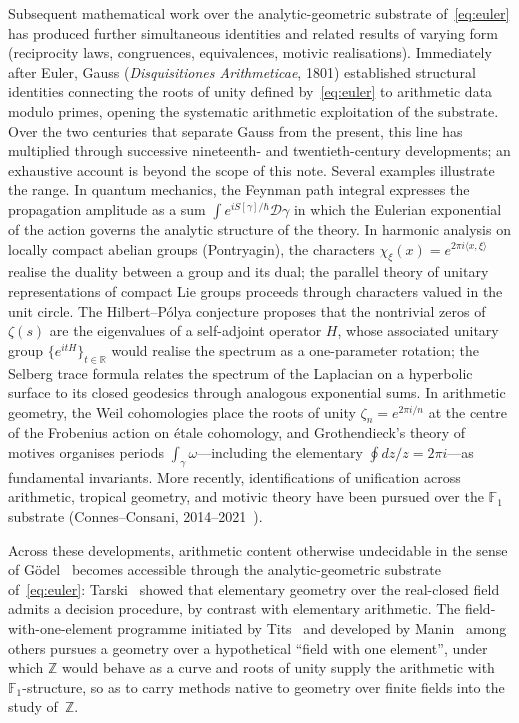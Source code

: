 \documentclass[11pt]{amsart}
\theoremstyle{definition}
\begin{document}
Subsequent mathematical work over the analytic-geometric substrate
of~\eqref{eq:euler} has produced further simultaneous identities and
related results of varying form (reciprocity laws, congruences,
equivalences, motivic realisations).  Immediately after Euler, Gauss (\emph{Disquisitiones
Arithmeticae}, 1801) established structural identities connecting the
roots of unity defined by~\eqref{eq:euler} to arithmetic data modulo
primes, opening the systematic arithmetic exploitation of the
substrate.  Over the two centuries that separate Gauss from the
present, this line has multiplied through successive
nineteenth- and twentieth-century developments; an exhaustive
account is beyond the scope of this note.  Several examples
illustrate the range.  In quantum mechanics, the Feynman path
integral expresses the propagation amplitude as a sum
$\int e^{iS[\gamma]/\hbar}\mathcal{D}\gamma$ in which the Eulerian
exponential of the action governs the analytic structure of the
theory.  In harmonic analysis on locally compact abelian groups
(Pontryagin), the characters
$\chi_\xi(x)=e^{2\pi i\langle x,\xi\rangle}$ realise the duality
between a group and its dual; the parallel theory of unitary
representations of compact Lie groups proceeds through characters
valued in the unit circle.  The Hilbert--Pólya conjecture proposes
that the nontrivial zeros of $\zeta(s)$ are the eigenvalues of a
self-adjoint operator $H$, whose associated unitary group
$\{e^{itH}\}_{t\in\mathbb{R}}$ would realise the spectrum as a
one-parameter rotation; the Selberg trace formula relates the
spectrum of the Laplacian on a hyperbolic surface to its closed
geodesics through analogous exponential sums.  In arithmetic
geometry, the Weil cohomologies place the roots of unity
$\zeta_n=e^{2\pi i/n}$ at the centre of the Frobenius action on
étale cohomology, and Grothendieck's theory of motives organises
periods $\int_\gamma\omega$---including the elementary
$\oint dz/z=2\pi i$---as fundamental invariants.  More recently,
identifications of unification across arithmetic, tropical
geometry, and motivic theory have been pursued over the
$\mathbb{F}_{1}$ substrate
(Connes--Consani, 2014--2021~\cite{connes-consani-site}).

Across these developments, arithmetic content otherwise undecidable in
the sense of Gödel~\cite{godel-1931} becomes accessible through the
analytic-geometric substrate of~\eqref{eq:euler}:
Tarski~\cite{tarski-1948} showed that elementary geometry over the
real-closed field admits a decision procedure, by contrast with
elementary arithmetic.  The field-with-one-element programme initiated
by Tits~\cite{tits-1957} and developed by Manin~\cite{manin-1995} among
others pursues a geometry over a hypothetical ``field with one
element'', under which $\mathbb{Z}$ would behave as a curve and roots of
unity supply the arithmetic with $\mathbb{F}_{1}$-structure, so as to
carry methods native to geometry over finite fields into the study
of~$\mathbb{Z}$.
\end{document}
